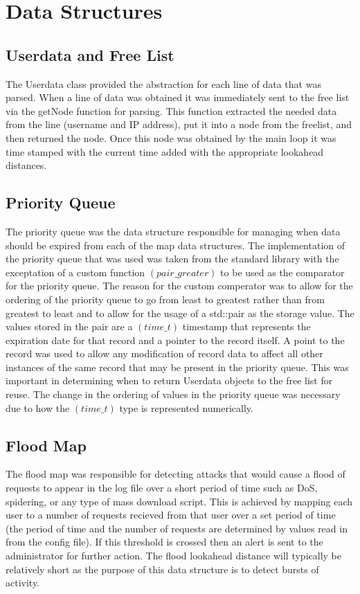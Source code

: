 \documentclass[12pt]{report}
\begin{document}
\section*{Data Structures}
	\subsection*{Userdata and Free List}
	The Userdata class provided the abstraction for each line of data that
	was parsed. When a line of data was obtained it was immediately sent to the
	free list via the getNode function for parsing. This function extracted the
	needed data from the line (username and IP address), put it into a node from
	the freelist, and then returned the node. Once this node was obtained by the 
	main loop it was time stamped with the current time added with the appropriate	
	lookahead distances.
	
	\subsection*{Priority Queue}
	The priority queue was the data	structure responsible for managing when data 
	should be expired from each of the map data structures. The implementation
	of the priority queue that was used was taken from the standard library with
	the exceptation of a custom function $(pair\_greater)$ to be used as the comparator
	for the priority queue. The reason for the custom comperator was to allow for the
	ordering of the priority queue to go from least to greatest rather than from 
	greatest to least and to allow for the usage of a std::pair as the storage value. The 
	values stored in the pair are a $(time\_t)$ timestamp that represents the expiration 
	date for that record and a pointer to the record itself. A point to the record was 
	used to allow any modification of record data to affect all other instances of the 
	same record that may be present in the priority queue. This was important in 
	determining when to return Userdata objects to the free list for reuse. The change in 
	the ordering of values in the priority queue was necessary due to how the $(time\_t)$
	type is represented numerically.

	\subsection*{Flood Map}
	The flood map was responsible for detecting attacks that would cause a flood 
	of requests to appear in the log file over a short period of time such as
	DoS, spidering, or any type of mass download script. This is achieved by mapping
	each user to a number of requests recieved from that user over a set period of time
	(the period of time and the number of requests are determined by values read in from
	the config file). If this threshold is crossed then an alert is sent to the administrator for further action. The flood lookahead distance will typically be
	relatively short as the purpose of this data structure is to detect bursts of 
	activity.
\end{document}
